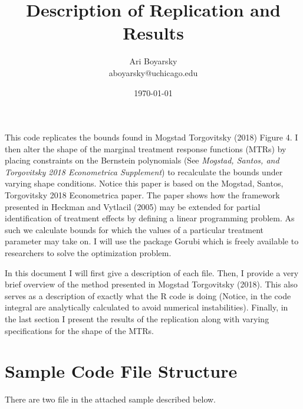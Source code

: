 \documentclass[dvip,11pt]{article}
\DeclareMathOperator{\?}{\,?\,}
\begin{document}

\title{\vspace{-100pt} Description of Replication and Results}
\author{Ari Boyarsky \\ aboyarsky@uchicago.edu }
\date{\today}

\maketitle


This code replicates the bounds found in Mogstad Torgovitsky (2018) Figure 4. I then alter the shape of the marginal treatment response functions (MTRs) by placing constraints on the  Bernstein polynomials (See \textit{Mogstad, Santos, and Torgovitsky 2018 Econometrica Supplement}) to recalculate the bounds under varying shape conditions. Notice this paper is based on the Mogstad, Santos, Torgovitsky 2018 Econometrica paper. The paper shows how the framework presented in Heckman and Vytlacil (2005) may be extended for partial identification of treatment effects by defining a linear programming problem. As such we calculate bounds for which the values of a particular treatment parameter may take on. I will use the package Gorubi which is freely available to researchers to solve the optimization problem.

In this document I will first give a description of each file. Then, I provide a very brief overview of the method presented in Mogstad Torgovitsky (2018). This also serves as a description of exactly what the R code is doing (Notice, in the code integral are analytically calculated to avoid numerical instabilities). Finally, in the last section I present the results of the replication along with varying specifications for the shape of the MTRs. 

\section{Sample Code File Structure}

There are two file in the attached sample described below.
\end{document}

